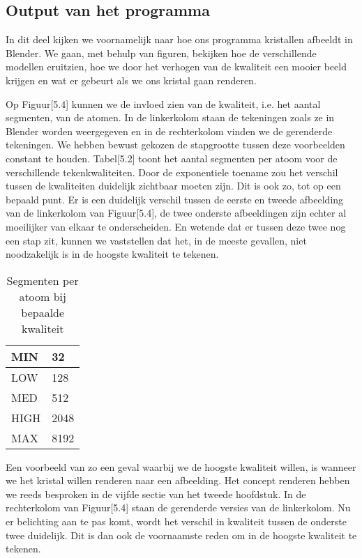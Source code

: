 \subsection{Output van het programma}
In dit deel kijken we voornamelijk naar hoe ons programma kristallen afbeeldt in Blender. We gaan, met behulp van figuren, bekijken hoe de verschillende modellen eruitzien, hoe we door het verhogen van de kwaliteit een mooier beeld krijgen en wat er gebeurt als we ons kristal gaan renderen.
\par
Op Figuur[5.4] kunnen we de invloed zien van de kwaliteit, i.e. het aantal segmenten, van de atomen. In de linkerkolom staan de tekeningen zoals ze in Blender worden weergegeven en in de rechterkolom vinden we de gerenderde tekeningen. We hebben bewust gekozen de stapgrootte tussen deze voorbeelden constant te houden. Tabel[5.2] toont het aantal segmenten per atoom voor de verschillende tekenkwaliteiten. Door de exponentiele toename zou het verschil tussen de kwaliteiten duidelijk zichtbaar moeten zijn. Dit is ook zo, tot op een bepaald punt. Er is een duidelijk verschil tussen de eerste en tweede afbeelding van de linkerkolom van Figuur[5.4], de twee onderste afbeeldingen zijn echter al moeilijker van elkaar te onderscheiden. En wetende dat er tussen deze twee nog een stap zit, kunnen we vaststellen dat het, in de meeste gevallen, niet noodzakelijk is in de hoogste kwaliteit te tekenen.   
\par
\begin{table}[H]
\caption{Segmenten per atoom bij bepaalde kwaliteit}
\begin{tabular}{|l|l|}
\hline
MIN  & 32   \\ \hline
LOW  & 128  \\ \hline
MED  & 512  \\ \hline
HIGH & 2048 \\ \hline
MAX  & 8192 \\ \hline
\end{tabular}
\end{table}
\par
Een voorbeeld van zo een geval waarbij we de hoogste kwaliteit willen, is wanneer we het kristal willen renderen naar een afbeelding. Het concept renderen hebben we reeds besproken in de vijfde sectie van het tweede hoofdstuk. In de rechterkolom van Figuur[5.4] staan de gerenderde versies van de linkerkolom. Nu er belichting aan te pas komt, wordt het verschil in kwaliteit tussen de onderste twee duidelijk. Dit is dan ook de voornaamste reden om in de hoogste kwaliteit te tekenen.   
\par


